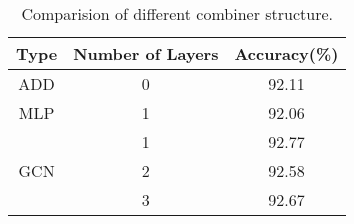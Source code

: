 \documentclass[conference]{IEEEtran}
\begin{document}
\begin{table}[!tp]
\caption{Comparision of different combiner structure.}
\begin{center}
\begin{tabular}{|c|c|c|}
\hline
Type & Number of Layers & Accuracy(\%) \\ \hline
ADD & 0 & 92.11 \\ \hline
MLP & 1 & 92.06 \\ \hline
\multirow{3}{*}{GCN} & 1 & 92.77 \\ \cline{2-3} 
                       & 2 & 92.58 \\ \cline{2-3} 
                       & 3 & 92.67 \\ 
\hline
\end{tabular}
\label{tab7}
\end{center}
\end{table}
\end{document}
